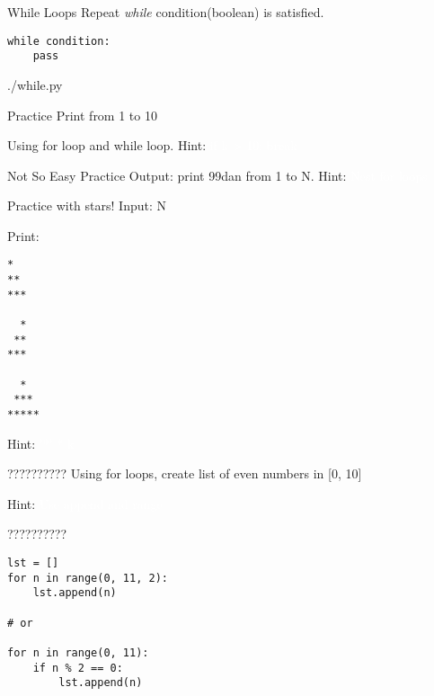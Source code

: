 \documentclass{beamer}
\begin{document}
\begin{frame}{While Loops}
  Repeat \textit{while} condition(boolean) is satisfied.
\end{frame}

\begin{frame}[fragile]
  \begin{lstlisting}
while condition:
    pass
  \end{lstlisting}
\end{frame}

\begin{frame}[fragile]
  \begin{lstinputlisting}
    {./while.py}
  \end{lstinputlisting}
\end{frame}

\begin{frame}{Practice}
  Print from 1 to 10

  Using for loop and while loop.
  Hint: \textcolor{white}{if k > 10: break}
\end{frame}

\begin{frame}{Not So Easy Practice}
  Output: print 99dan from 1 to N.
  Hint: \textcolor{white}{Nest for loops}
\end{frame}

\begin{frame}[fragile]{Practice with stars!}
  Input: N

  Print:
  \begin{lstlisting}
*
**
***

  *
 **
***

  *
 ***
*****
  \end{lstlisting}
  Hint: \textcolor{white}{'*' * k}
\end{frame}


\begin{frame}{??????????}
  Using for loops, create list of even numbers in [0, 10]

  Hint: \textcolor{white}{Use append and range}
\end{frame}

\begin{frame}[fragile]{??????????}
  \begin{lstlisting}
lst = []
for n in range(0, 11, 2):
    lst.append(n)

# or

for n in range(0, 11):
    if n % 2 == 0:
        lst.append(n)
  \end{lstlisting}
\end{frame}
\end{document}
